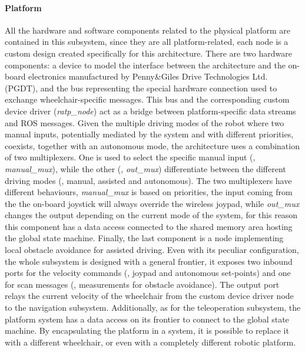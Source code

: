 \paragraph{Platform} All the hardware and software components related to the physical platform are contained in this subsystem, since they are all platform-related, each node is a custom design created specifically for this architecture. There are two hardware components: a device to model the interface between the architecture and the on-board electronics manufactured by Penny\&Giles Drive Technologies Ltd. (PGDT), and the bus representing the special hardware connection used to exchange wheelchair-specific messages. This bus and the corresponding custom device driver (\textit{ratp\_node}) act as a bridge between platform-specific data streams and ROS messages. Given the multiple driving modes of the robot where two manual inputs, potentially mediated by the system and with different priorities, coexists, together with an autonomous mode, the architecture uses a combination of two multiplexers. One is used to select the specific manual input (\ie, \textit{manual\_mux}), while the other (\ie, \textit{out\_mux}) differentiate between the different driving modes (\ie, manual, assisted and autonomous). The two multiplexers have different behaviours, \textit{manual\_mux} is based on priorities, the input coming from the the on-board joystick will always override the wireless joypad, while \textit{out\_mux} changes the output depending on the current mode of the system, for this reason this component has a data access connected to the shared memory area hosting the global state machine. Finally, the last component is a node implementing local obstacle avoidance for assisted driving. Even with its peculiar configuration, the whole subsystem is designed with a general frontier, it exposes two inbound ports for the velocity commands (\ie, joypad and autonomous set-points) and one for scan messages (\ie, measurements for obstacle avoidance). The output port relays the current velocity of the wheelchair from the custom device driver node to the navigation subsystem. Additionally, as for the teleoperation subsystem, the platform system has a data access on its frontier to connect to the global state machine. By encapsulating the platform in a system, it is possible to replace it with a different wheelchair, or even with a completely different robotic platform.

